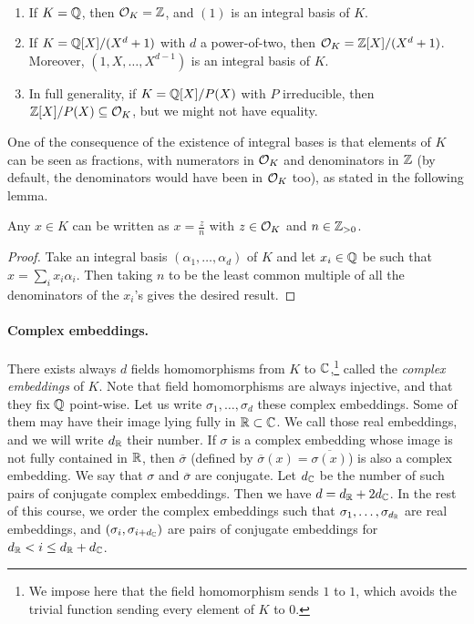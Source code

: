 \begin{example}\ 
\begin{enumerate}
\item If $K = \mathbb{Q}$, then $\mathcal{O}_K = \mathbb{Z}$, and $(1)$ is an integral basis of $K$.
\item If $K = \mathbb{Q}[X]/(X^d+1)$ with $d$ a power-of-two, then $\mathcal{O}_K = \mathbb{Z}[X]/(X^d+1)$. Moreover, $(1,X, \dots, X^{d-1})$ is an integral basis of $K$.
\item In full generality, if $K = \mathbb{Q}[X]/P(X)$ with $P$ irreducible, then $\mathbb{Z}[X]/P(X) \subseteq \mathcal{O}_K$, but we might not have equality.
\end{enumerate}
\end{example}

One of the consequence of the existence of integral bases is that elements of $K$ can be seen as fractions, with numerators in $\mathcal{O}_K$ and denominators in $\mathbb{Z}$ (by default, the denominators would have been in $\mathcal{O}_K$ too), as stated in the following lemma.
\begin{lemma}
Any $x \in K$ can be written as $x = \frac{z}{n}$ with $z \in \mathcal{O}_K$ and $n \in \mathbb{Z}_{>0}$.
\end{lemma}
\begin{proof}
Take an integral basis $(\alpha_1, \dots, \alpha_d)$ of $K$ and let $x_i \in \mathbb{Q}$ be such that $x = \sum_i x_i \alpha_i$. Then taking $n$ to be the least common multiple of all the denominators of the $x_i$'s gives the desired result.
\end{proof}

\paragraph{Complex embeddings.} There exists always $d$ fields homomorphisms from $K$ to $\mathbb{C}$,\footnote{We impose here that the field homomorphism sends $1$ to $1$, which avoids the trivial function sending every element of $K$ to $0$.} called the \emph{complex embeddings} of $K$. Note that field homomorphisms are always injective, and that they fix $\mathbb{Q}$ point-wise. Let us write $\sigma_1, \dots, \sigma_d$ these complex embeddings. Some of them may have their image lying fully in $\mathbb{R} \subset \mathbb{C}$. We call those real embeddings, and we will write $d_{\mathbb{R}}$ their number. If $\sigma$ is a complex embedding whose image is not fully contained in $\mathbb{R}$, then $\overline{\sigma}$ (defined by $\overline{\sigma}(x) = \overline{\sigma(x)}$) is also a complex embedding. We say that $\sigma$ and $\overline{\sigma}$ are conjugate. Let $d_{\mathbb{C}}$ be the number of such pairs of conjugate complex embeddings. Then we have $d = d_{\mathbb{R}} + 2 d_{\mathbb{C}}$. In the rest of this course, we order the complex embeddings such that $\sigma_1, \dots, \sigma_{d_{\mathbb{R}}}$ are real embeddings, and $(\sigma_i, \sigma_{i+d_{\mathbb{C}}})$ are pairs of conjugate embeddings for $d_{\mathbb{R}} < i \leq d_{\mathbb{R}}+d_{\mathbb{C}}$.

